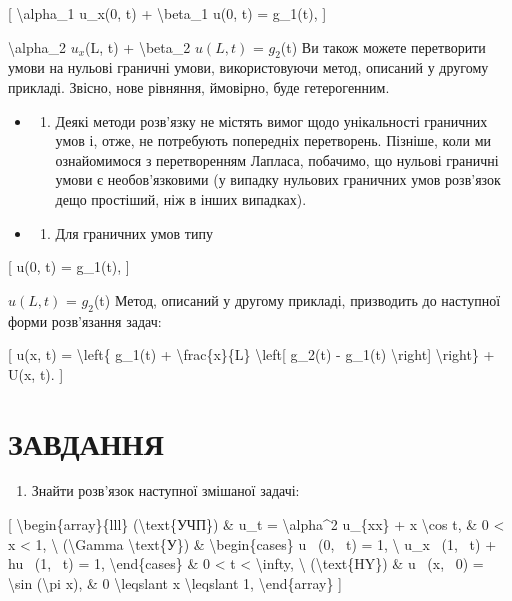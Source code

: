\documentclass[
]{article}
\providecommand{\tightlist}{%
  \setlength{\itemsep}{0pt}\setlength{\parskip}{0pt}}
\begin{document}
{[} \textbackslash alpha\_1 u\_x(0, t) + \textbackslash beta\_1 u(0, t)
= g\_1(t), {]}

\textbackslash alpha\_2 \(u_x\)(L, t) + \textbackslash beta\_2
\(u(L, t)\) = \(g_2\)(t) Ви також можете перетворити умови на нульові
граничні умови, використовуючи метод, описаний у другому прикладі.
Звісно, нове рівняння, ймовірно, буде гетерогенним.

\begin{itemize}
\tightlist
\item
  \begin{enumerate}
  \def\labelenumi{\arabic{enumi}.}
  \setcounter{enumi}{2}
  \tightlist
  \item
    Деякі методи розв'язку не містять вимог щодо унікальності граничних
    умов і, отже, не потребують попередніх перетворень. Пізніше, коли ми
    ознайомимося з перетворенням Лапласа, побачимо, що нульові граничні
    умови є необов'язковими (у випадку нульових граничних умов розв'язок
    дещо простіший, ніж в інших випадках).
  \end{enumerate}
\item
  \begin{enumerate}
  \def\labelenumi{\arabic{enumi}.}
  \setcounter{enumi}{3}
  \tightlist
  \item
    Для граничних умов типу
  \end{enumerate}
\end{itemize}

{[} u(0, t) = g\_1(t), {]}

\(u(L, t)\) = \(g_2\)(t) Метод, описаний у другому прикладі, призводить
до наступної форми розв'язання задач:

{[} u(x, t) = \textbackslash left\{ g\_1(t) +
\textbackslash frac\{x\}\{L\} \textbackslash left{[} g\_2(t) - g\_1(t)
\textbackslash right{]} \textbackslash right\} + U(x, t). {]}

\section{ЗАВДАННЯ}\label{ux437ux430ux432ux434ux430ux43dux43dux44f-3}

\begin{enumerate}
\def\labelenumi{\arabic{enumi}.}
\tightlist
\item
  Знайти розв'язок наступної змішаної задачі:
\end{enumerate}

{[} \textbackslash begin\{array\}\{lll\} (\textbackslash text\{УЧП\}) \&
u\_t = \textbackslash alpha\^{}2 u\_\{xx\} + x \textbackslash cos t, \&
0 \textless{} x \textless{} 1, \textbackslash{} (\textbackslash Gamma
\textbackslash text\{У\}) \& \textbackslash begin\{cases\} u ~(0, ~t) =
1, \textbackslash{} u\_x ~(1, ~t) + hu ~(1, ~t) = 1,
\textbackslash end\{cases\} \& 0 \textless{} t \textless{}
\textbackslash infty, \textbackslash{} (\textbackslash text\{HY\}) \& u
~(x, ~0) = \textbackslash sin (\textbackslash pi x), \& 0
\textbackslash leqslant x \textbackslash leqslant 1,
\textbackslash end\{array\} {]}
\end{document}
